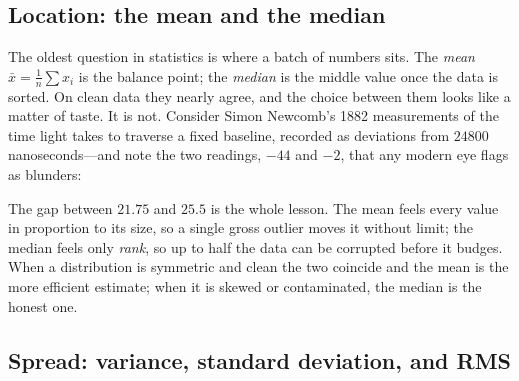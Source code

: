 \subsection{Location: the mean and the median}
\label{ssec:stat-location}

The oldest question in statistics is where a batch of numbers sits. The
\emph{mean} \(\bar x = \tfrac1n\sum x_i\) is the balance point; the \emph{median}
is the middle value once the data is sorted. On clean data they nearly agree, and
the choice between them looks like a matter of taste. It is not. Consider Simon
Newcomb's 1882 measurements of the time light takes to traverse a fixed
baseline, recorded as deviations from \(24800\)
nanoseconds---and note the two readings, \(-44\) and \(-2\), that any modern eye
flags as blunders:

\begin{codepairs}
\end{codepairs}

The gap between \(21.75\) and \(25.5\) is the whole lesson. The mean feels every
value in proportion to its size, so a single gross outlier moves it without limit;
the median feels only \emph{rank}, so up to half the data can be corrupted before
it budges. When a distribution is symmetric and clean the two coincide and the
mean is the more efficient estimate; when it is skewed or contaminated, the median
is the honest one.


\subsection{Spread: variance, standard deviation, and RMS}
\label{ssec:stat-spread}


